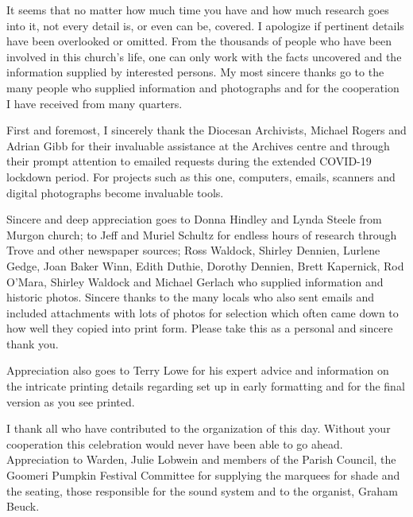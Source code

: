 It seems that no matter how much time you have and how much research goes into it, not every detail is, or even can be, covered. I apologize if pertinent details have been overlooked or omitted. From the thousands of people who have been involved in this church's life, one can only work with the facts uncovered and the information supplied by interested persons. My most sincere thanks go to the many people who supplied information and photographs and for the cooperation I have received from many quarters.



First and foremost, I sincerely thank the Diocesan Archivists, Michael Rogers and Adrian Gibb for their invaluable assistance at the Archives centre and through their prompt attention to emailed requests during the extended COVID-19 lockdown period. For projects such as this one, computers, emails, scanners and digital photographs become invaluable tools.



Sincere and deep appreciation goes to Donna Hindley and Lynda Steele from Murgon church; to Jeff and Muriel Schultz for endless hours of research through Trove and other newspaper sources; Ross Waldock, Shirley Dennien, Lurlene Gedge, Joan Baker Winn, Edith Duthie, Dorothy Dennien, Brett Kapernick, Rod O'Mara, Shirley Waldock and Michael Gerlach who supplied information and historic photos. Sincere thanks to the many locals who also sent emails and included attachments with lots of photos for selection which often came down to how well they copied into print form. Please take this as a personal and sincere thank you.



Appreciation also goes to Terry Lowe for his expert advice and information on the intricate printing details regarding set up in early formatting and for the final version as you see printed.



I thank all who have contributed to the organization of this day. Without your cooperation this celebration would never have been able to go ahead. Appreciation to Warden, Julie Lobwein and members of the Parish Council, the Goomeri Pumpkin Festival Committee for supplying the marquees for shade and the seating, those responsible for the sound system and to the organist, Graham Beuck.




